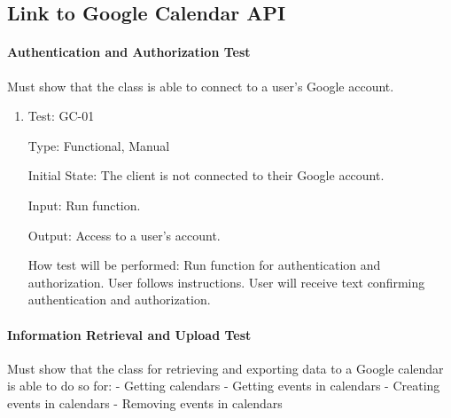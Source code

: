 \documentclass[12pt, titlepage]{article}
\begin{document}
\subsection{Link to Google Calendar API}

\paragraph{Authentication and Authorization Test}
Must show that the class is able to connect to a user's Google account.
\begin{enumerate}

\item{Test: GC-01\\}

Type: Functional, Manual
					
Initial State: The client is not connected to their Google account. 
					
Input: Run function.
					
Output: Access to a user's account.
					
How test will be performed: Run function for authentication and authorization. 
User follows instructions. 
User will receive text confirming authentication and authorization.
\end{enumerate}

\paragraph{Information Retrieval and Upload Test}
Must show that the class for retrieving and exporting data to a Google calendar is able to do so for:
- Getting calendars
- Getting events in calendars
- Creating events in calendars
- Removing events in calendars
\end{document}

